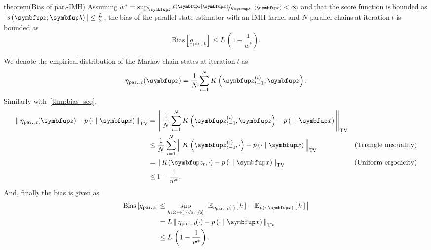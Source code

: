 
\begin{theoremEnd}{theorem}(Bias of par.-IMH)
  Assuming \(w^* = \sup_{\vz} \nicefrac{p\left(\vz\mid\vx\right)}{q_{\vlambda_{\tau}}\left(\vz\right)} < \infty\) and that the score function is bounded as \(\left|\, s\left(\vz; \vlambda\right) \,\right| \leq \frac{L}{2}\), the bias of the parallel state estimator with an IMH kernel and \(N\) parallel chains at iteration \(t\) is bounded as
  {\small
\[
    \mathrm{Bias}\left[ g_{\mathrm{par.,\, t}} \right] \leq L\, \left(1 - \frac{1}{w^*}\right).
\]
  }
\end{theoremEnd}
\begin{proofEnd}
  We denote the empirical distribution of the Markov-chain states at iteration \(t\) as
  \begin{align}
    \eta_{\mathrm{par.},\, t}(\vz) = \frac{1}{N} \sum_{i=1}^N K\left(\vz_{t-1}^{(i)}, \vz\right).
  \end{align}
  Similarly with~\cref{thm:bias_seq}, 
  \begin{align}
    \DTV{ \eta_{\mathrm{par.},\, t}(\vz) }{p\left(\cdot\mid\vx\right)}
    &= \DTV{\frac{1}{N} \sum_{i=1}^N K\left(\vz_{t-1}^{(i)}, \vz\right)}{p\left(\cdot\mid\vx\right)} \\
    &\leq \frac{1}{N} \sum_{i=1}^N  \DTV{K\left(\vz_{t-1}^{(i)}, \cdot\right)}{p\left(\cdot\mid\vx\right)} &\text{(Triangle inequality)} \\
    &=    \DTV{K(\vz_t, \cdot)}{p\left(\cdot\mid\vx\right)} &\text{(Uniform ergodicity)} \\
    &\leq 1 - \frac{1}{w^*}.
  \end{align}
  And, finally the bias is given as
 \begin{align}
   \mathrm{Bias}\left[ g_{\mathrm{par., t}} \right]
   &\leq \sup_{h : \mathcal{Z} \rightarrow \left[ \text{-}\nicefrac{L}{2}, \nicefrac{L}{2} \right]} \left|\, \Esub{\eta_{\mathrm{par.},\, t}(\cdot)}{h} - \Esub{p(\cdot\mid\vx)}{h} \,\right| \\
   &= L\, \DTV{ \eta_{\mathrm{par.},\, t}(\cdot) }{p\left(\cdot\mid\vx\right)}  \\
   &\leq L \, \left(1 - \frac{1}{w^*}\right).
 \end{align}
\end{proofEnd}


